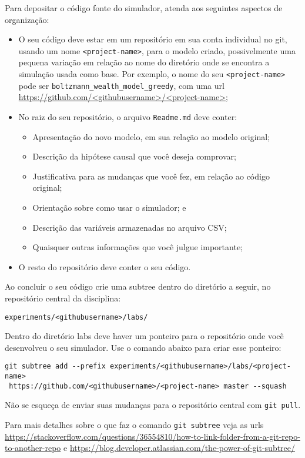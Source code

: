 Para depositar o código fonte do simulador, atenda aos seguintes aspectos de organização:
\begin{itemize}
    \item O seu código deve estar em um repositório em sua conta individual no git, usando um nome \verb|<project-name>|, para o modelo criado, possivelmente uma pequena variação em relação ao nome do diretório onde se encontra a simulação usada como base. Por exemplo, o nome do seu \verb|<project-name>| pode ser
    \verb|boltzmann_wealth_model_greedy|, com uma url \url{https://github.com/<githubusername>/<project-name>};
    \item No raiz do seu repositório, o arquivo \verb|Readme.md| deve conter:
    \begin{itemize}
        \item Apresentação do novo modelo, em sua relação ao modelo original;
        \item Descrição da hipótese causal que você deseja comprovar;
        \item Justificativa para as mudanças que você fez, em relação ao código original;
        \item Orientação sobre como usar o simulador; e
        \item Descrição das variáveis armazenadas no arquivo CSV;
        \item Quaisquer outras informações que você julgue importante;
    \end{itemize}
    \item O resto do repositório deve conter o seu código.
\end{itemize}

Ao concluir o seu código crie uma subtree dentro do diretório a seguir, no repositório central da disciplina:

\verb|experiments/<githubusername>/labs/|

Dentro do diretório labs deve haver um ponteiro para o repositório onde você desenvolveu o seu simulador. Use o comando abaixo para criar esse ponteiro:

{\footnotesize
\begin{verbatim}
git subtree add --prefix experiments/<githubusername>/labs/<project-name> 
 https://github.com/<githubusername>/<project-name> master --squash
\end{verbatim}
}

Não se esqueça de enviar suas mudanças para o repositório central com \verb|git pull|.

Para mais detalhes sobre o que faz o comando \verb|git subtree| veja as urls \url{https://stackoverflow.com/questions/36554810/how-to-link-folder-from-a-git-repo-to-another-repo} e \url{https://blog.developer.atlassian.com/the-power-of-git-subtree/}

